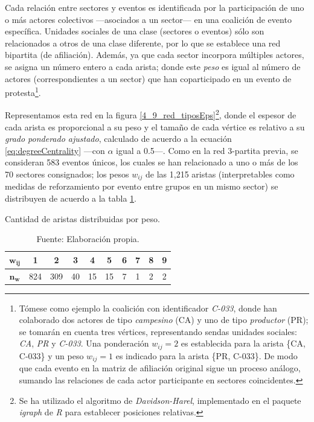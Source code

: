\documentclass[letterpaper, 11pt]{book}
\theoremstyle{definition}
\theoremstyle{remark}
\begin{document}
Cada relación entre sectores y eventos es identificada por la participación de uno o más actores colectivos ---asociados a un sector--- en una coalición de evento específica. 
Unidades sociales de una clase (sectores o eventos) sólo son relacionados a otros de una clase diferente, por lo que se establece una red bipartita (de afiliación). 
Además, ya que cada sector incorpora múltiples actores, se asigna un número entero a cada arista; donde este \emph{peso} es igual al número de actores (correspondientes a un sector) que han coparticipado en un evento de protesta\footnote{
    Tómese como ejemplo la coalición con identificador \emph{C-033}, donde han colaborado dos actores de tipo \emph{campesino} (CA) y uno de tipo \emph{productor} (PR); se tomarán en cuenta tres vértices, representando sendas unidades sociales: \emph{CA}, \emph{PR} y \emph{C-033}. 
    Una ponderación $w_{ij}=2$ es establecida para la arista \{CA, C-033\} y un peso $w_{ij}=1$ es indicado para la arista \{PR, C-033\}. 
    De modo que cada evento en la matriz de afiliación original sigue un proceso análogo, sumando las relaciones de cada actor participante en sectores coincidentes. 
}. 


Representamos esta red en la figura \ref{4_9_red_tiposEps}\footnote{
    Se ha utilizado el algoritmo de \emph{Davidson-Harel}, implementado en el paquete \emph{igraph} de \emph{R} para establecer posiciones relativas. 
}, donde el espesor de cada arista es proporcional a su peso y el tamaño de cada vértice es relativo a su \emph{grado ponderado ajustado}, calculado de acuerdo a la ecuación \ref{eq:degreeCentrality} ---con $\alpha$ igual a 0.5---. 
Como en la red 3-partita previa, se consideran 583 eventos únicos, los cuales se han relacionado a uno o más de los 70 sectores consignados;  los pesos $w_{ij}$ de las 1,215 aristas  (interpretables como medidas de reforzamiento por evento entre grupos en un mismo sector) se distribuyen de acuerdo a la tabla \ref{Aristas_por_peso_tiposEPs}. 


\begin{table}[!hbt]
\center
\footnotesize
\caption{Cantidad de aristas distribuidas por peso.}
\label{Aristas_por_peso_tiposEPs}
\begin{tabular}{ | c | c | c | c | c | c | c | c | c | c | } 
\hline
$\mathbf{w_{ij}}$ & \textbf{1} & \textbf{2} & \textbf{3} & \textbf{4} & \textbf{5} & \textbf{6} & \textbf{7} & \textbf{8} & \textbf{9}\\ \hline
$\mathbf{n_{w}}$ & 824 & 309 & 40 & 15 & 15 & 7 & 1 & 2 & 2\\ \hline
\end{tabular}
\par\bigskip
\caption*{\small Fuente: Elaboración propia.}
\end{table}
\end{document}
